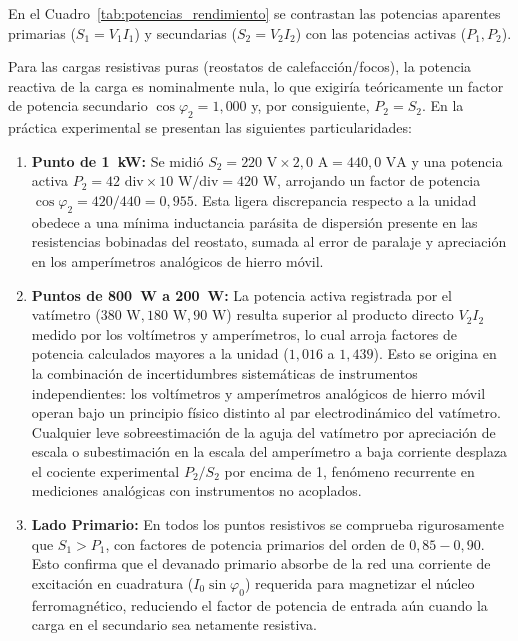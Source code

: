 En el Cuadro~\ref{tab:potencias_rendimiento} se contrastan las potencias aparentes primarias ($S_1 = V_1 I_1$) y secundarias ($S_2 = V_2 I_2$) con las potencias activas ($P_1, P_2$).

Para las cargas resistivas puras (reostatos de calefacción/focos), la potencia reactiva de la carga es nominalmente nula, lo que exigiría teóricamente un factor de potencia secundario $\cos\varphi_2 = 1{,}000$ y, por consiguiente, $P_2 = S_2$. En la práctica experimental se presentan las siguientes particularidades:
\begin{enumerate}
    \item \textbf{Punto de 1~kW:} Se midió $S_2 = 220\text{ V} \times 2{,}0\text{ A} = 440{,}0\text{ VA}$ y una potencia activa $P_2 = 42\text{ div} \times 10\text{ W/div} = 420\text{ W}$, arrojando un factor de potencia $\cos\varphi_2 = 420/440 = 0{,}955$. Esta ligera discrepancia respecto a la unidad obedece a una mínima inductancia parásita de dispersión presente en las resistencias bobinadas del reostato, sumada al error de paralaje y apreciación en los amperímetros analógicos de hierro móvil.
    \item \textbf{Puntos de 800~W a 200~W:} La potencia activa registrada por el vatímetro ($380\text{ W}, 180\text{ W}, 90\text{ W}$) resulta superior al producto directo $V_2 I_2$ medido por los voltímetros y amperímetros, lo cual arroja factores de potencia calculados mayores a la unidad ($1{,}016$ a $1{,}439$). Esto se origina en la combinación de incertidumbres sistemáticas de instrumentos independientes: los voltímetros y amperímetros analógicos de hierro móvil operan bajo un principio físico distinto al par electrodinámico del vatímetro. Cualquier leve sobreestimación de la aguja del vatímetro por apreciación de escala o subestimación en la escala del amperímetro a baja corriente desplaza el cociente experimental $P_2/S_2$ por encima de 1, fenómeno recurrente en mediciones analógicas con instrumentos no acoplados.
    \item \textbf{Lado Primario:} En todos los puntos resistivos se comprueba rigurosamente que $S_1 > P_1$, con factores de potencia primarios del orden de $0{,}85 - 0{,}90$. Esto confirma que el devanado primario absorbe de la red una corriente de excitación en cuadratura ($I_0 \sin\varphi_0$) requerida para magnetizar el núcleo ferromagnético, reduciendo el factor de potencia de entrada aún cuando la carga en el secundario sea netamente resistiva.
\end{enumerate}

